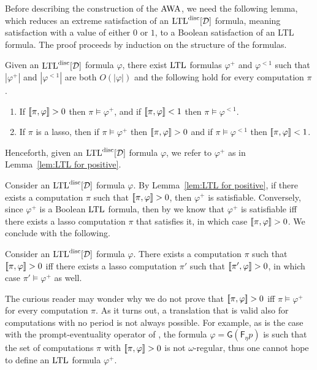 \documentclass{llncs}
\newcommand{\LTL}{{\ensuremath{\rm LTL}}\xspace}
\newcommand{\Ev}{\mathsf{F}}
\newcommand{\Alw}{\mathsf{G}}
\newcommand{\AWW}{\mbox{\rm AWA}\xspace}
\newcommand{\D}{{\cal D}}
\renewcommand{\phi}{\varphi}
\newcommand{\DLTL}{\ensuremath{\LTL^{\text{disc}}[\D]}}
\newcommand{\LTLD}{\DLTL}
\newcommand{\pos}[1]{{#1}^{+}}
\newcommand{\notone}[1]{{#1}^{<1}}
\begin{document}
Before describing the construction of the $\AWW$, we need the following lemma, which reduces an extreme satisfaction of an $\DLTL$ formula, meaning satisfaction with a value of either $0$ or $1$, to a Boolean satisfaction of an LTL formula. The proof proceeds by induction on the structure of the formulas.
\begin{lemma}
\label{lem:LTL for positive}
Given an $\DLTL$ formula $\phi$, there exist $\LTL$ formulas $\pos{\phi}$ and $\notone{\phi}$ such that $|\pos{\phi}|$ and $|\notone{\phi}|$ are both $O(|\phi|)$ and the following hold for every computation $\pi$.
\begin{enumerate}
\item If $\sem{\pi,\phi}>0$ then $\pi\models \pos{\phi}$, and if $\sem{\pi,\phi}<1$ then $\pi\models \notone{\phi}$.
\item If $\pi$ is a lasso, then if $\pi\models \pos{\phi}$ then $\sem{\pi,\phi}> 0$ and if $\pi\models \notone{\phi}$ then $\sem{\pi,\phi}<1$.
\end{enumerate} 
\end{lemma}

Henceforth, given an $\LTLD$ formula $\phi$, we refer to $\pos{\phi}$ as in Lemma~\ref{lem:LTL for positive}.

Consider an $\DLTL$ formula $\phi$. By Lemma~\ref{lem:LTL for positive}, if there exists a computation $\pi$ such that $\sem{\pi,\phi}>0$, then $\pos{\phi}$ is satisfiable. Conversely, since $\pos{\phi}$ is a Boolean $\LTL$ formula, then by \cite{Var96} we know that $\pos{\phi}$ is satisfiable iff there exists a lasso computation $\pi$ that satisfies it, in which case $\sem{\pi,\phi}>0$. We conclude with the following.
\begin{corollary}
\label{cor:satisfaction}
Consider an $\LTLD$ formula $\phi$. There exists a computation $\pi$ such that $\sem{\pi,\phi}>0$ iff there exists a lasso computation $\pi'$ such that $\sem{\pi',\phi}>0$, in which case $\pi'\models \pos{\phi}$ as well.
\end{corollary}

\begin{remark}
The curious reader may wonder why we do not prove that $\sem{\pi,\phi}>0$ iff $\pi\models\pos{\phi}$ for every computation $\pi$. As it turns out, a translation that is valid also for computations with no period is not always possible. For example, as is the case with the prompt-eventuality operator of \cite{KPV08}, the formula $\phi=\Alw(\Ev_\eta p)$ is such that the set of computations $\pi$ with $\sem{\pi,\phi}>0$ is not $\omega$-regular, thus one cannot hope to define an \LTL formula $\pos{\phi}$.
\end{remark}
\end{document}

